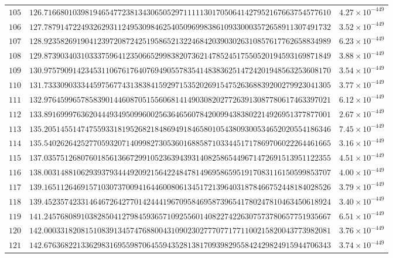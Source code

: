 \documentclass[12pt,reqno]{amsart}
\theoremstyle{remark}
\begin{document}
\begin{longtable}{clc}
$105$ & $126.7166801039819465477238134306505297111113017050641427952167663754577610$ & $4.27\times 10^{-449}$ \\
$106$ & $127.7879147224932629311249530984625405096998386109330003572658911307491732$ & $3.52\times 10^{-449}$ \\
$107$ & $128.9235826919041239720872425195865213224684203903026310857617762658834989$ & $6.23\times 10^{-449}$ \\
$108$ & $129.8739034031033375964123506652998382073621478524517550520194593169871849$ & $3.88\times 10^{-449}$ \\
$109$ & $130.9757909142345311067617640769490557835414838362514724201948563253608170$ & $3.54\times 10^{-449}$ \\
$110$ & $131.7333090333445975677431383841592971535202691547526368839200279923041305$ & $3.77\times 10^{-449}$ \\
$111$ & $132.9764599657858390144608705155606814149030820277263913087780617463397021$ & $6.12\times 10^{-449}$ \\
$112$ & $133.8916999763620444934950996002563646560784200994383802214926951377877001$ & $2.67\times 10^{-449}$ \\
$113$ & $135.2051455147475593318195268218486949184658010543809300534652020554186346$ & $7.45\times 10^{-449}$ \\
$114$ & $135.5402626425277059320714099827305360168858710334451717869706022264461665$ & $3.16\times 10^{-449}$ \\
$115$ & $137.0357512680760185613667299105236394393140825865449671472691513951122355$ & $4.51\times 10^{-449}$ \\
$116$ & $138.0031488106293937934449209215642248478149695865951917083116150599853707$ & $4.00\times 10^{-449}$ \\
$117$ & $139.1651126469157103073700941644600806134517213964031878466752448184028526$ & $3.79\times 10^{-449}$ \\
$118$ & $139.4523574233146467264277014244419670958469587396541780247810463450618924$ & $3.40\times 10^{-449}$ \\
$119$ & $141.2457680891038285041279845936571092556014082274226307573780657751935667$ & $6.51\times 10^{-449}$ \\
$120$ & $142.0003318208151083913457476880043109023027770771771100215820043773982081$ & $3.76\times 10^{-449}$ \\
$121$ & $142.6763682213362983169559870645594352813817093982955842429824915944706343$ & $3.74\times 10^{-449}$ \\

\end{longtable}
\end{document}
